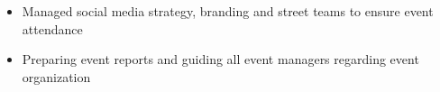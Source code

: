 \divider

 
\begin{itemize}
\item Managed social media strategy, branding and street teams to ensure event attendance
\item Preparing event reports and guiding all event managers regarding event organization
\end{itemize}

\divider









